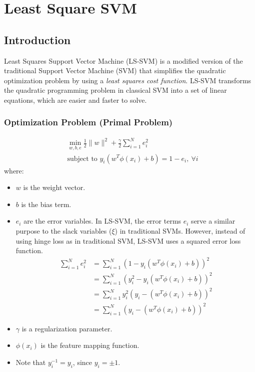 \chapter{Least Square SVM}
\label{ch:ls_svm}

\section{Introduction}
Least Squares Support Vector Machine (LS-SVM) is a modified version of the traditional Support Vector Machine (SVM) that simplifies the quadratic optimization problem by using a \textit{least squares cost function}. LS-SVM transforms the quadratic programming problem in classical SVM into a set of linear equations, which are easier and faster to solve. 

\subsection{Optimization Problem (Primal Problem)}

\begin{align*}
   &\min_{w, b, e} \frac{1}{2} \lVert w\rVert^2 + \frac{\gamma}{2} \sum_{i=1}^N e_i^2\\
   &\text{subject to } y_i (w^T \phi(x_i) + b) = 1 - e_i, \ \forall i
\end{align*}
where:
\begin{itemize}
   \item $w$ is the weight vector.
   \item $b$ is the bias term.
   \item $e_i$ are the error variables. In LS-SVM, the error terms $e_i$ serve a similar purpose to the slack variables ($\xi$) in traditional SVMs. However, instead of using hinge loss as in traditional SVM, LS-SVM uses a squared error loss function. 
\begin{align*}
	\sum_{i=1}^N e_i^2 &= \sum_{i=1}^N \left(1-y_i (w^T \phi(x_i) + b)\right)^2\\
					   &= \sum_{i=1}^N \left(y_i^2-y_i (w^T \phi(x_i) + b)\right)^2\\
					   &= \sum_{i=1}^N y_i^2\left(y_i-(w^T \phi(x_i) + b)\right)^2\\
					   &= \sum_{i=1}^N \left(y_i-(w^T \phi(x_i) + b)\right)^2
\end{align*}

   \item $\gamma$ is a regularization parameter.
   \item $\phi(x_i)$ is the feature mapping function.
   \item Note that $y_i^{-1} = y_i$, since $y_i = \pm 1$. 
\end{itemize}

